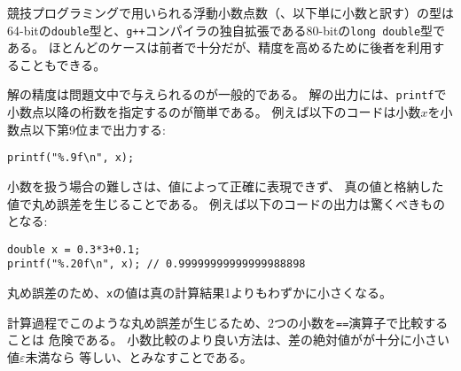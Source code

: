 競技プログラミングで用いられる浮動小数点数（、以下単に小数と訳す）の型は
64-bitの\texttt{double}型と、\texttt{g++}コンパイラの独自拡張である80-bitの\texttt{long double}型である。
ほとんどのケースは前者で十分だが、精度を高めるために後者を利用することもできる。

解の精度は問題文中で与えられるのが一般的である。
解の出力には、\texttt{printf}で小数点以降の桁数を指定するのが簡単である。
例えば以下のコードは小数$x$を小数点以下第9位まで出力する:

\begin{lstlisting}
printf("%.9f\n", x);
\end{lstlisting}

\begin{comment}
A difficulty when using floating point numbers
is that some numbers cannot be represented
accurately as floating point numbers,
and there will be rounding errors.
For example, the result of the following code
is surprising:
\end{comment}

小数を扱う場合の難しさは、値によって正確に表現できず、
真の値と格納した値で丸め誤差を生じることである。
例えば以下のコードの出力は驚くべきものとなる:

\begin{lstlisting}
double x = 0.3*3+0.1;
printf("%.20f\n", x); // 0.99999999999999988898
\end{lstlisting}

\begin{comment}
Due to a rounding error,
the value of \texttt{x} is a bit smaller than 1,
while the correct value would be 1.

It is risky to compare floating point numbers
with the \texttt{==} operator,
because it is possible that the values should be
equal but they are not because of precision errors.
A better way to compare floating point numbers
is to assume that two numbers are equal
if the difference between them is less than $\varepsilon$,
where $\varepsilon$ is a small number.
\end{comment}

丸め誤差のため、\texttt{x}の値は真の計算結果1よりもわずかに小さくなる。

計算過程でこのような丸め誤差が生じるため、2つの小数を\texttt{==}演算子で比較することは
危険である。
小数比較のより良い方法は、差の絶対値がが十分に小さい値$\varepsilon$未満なら
等しい、とみなすことである。

\begin{comment}
In practice, the numbers can be compared
as follows ($\varepsilon=10^{-9}$):
\end{comment}

